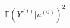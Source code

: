 \documentclass[preview]{standalone}
\begin{document}
\begin{align*}
\mathbb{E}(Y^{(t)} | u^{(0)})^2
\end{align*}
\end{document}

